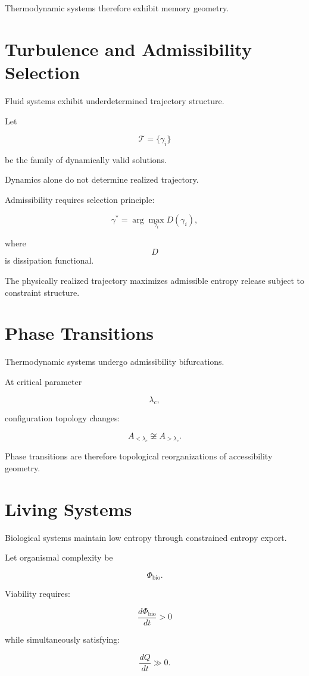 \documentclass[12pt,openany]{book}
\theoremstyle{plain}
\theoremstyle{definition}
\theoremstyle{remark}
\begin{document}
Thermodynamic systems therefore exhibit memory geometry.

\section{Turbulence and Admissibility Selection}

Fluid systems exhibit underdetermined trajectory structure.

Let

\[
\mathcal{T}
=
\{\gamma_i\}
\]

be the family of dynamically valid solutions.

Dynamics alone do not determine realized trajectory.

Admissibility requires selection principle:

\[
\gamma^\ast
=
\arg\max_{\gamma_i}
D(\gamma_i),
\]

where
\[
D
\]
is dissipation functional.

The physically realized trajectory maximizes admissible entropy
release subject to constraint structure.

\section{Phase Transitions}

Thermodynamic systems undergo admissibility bifurcations.

At critical parameter

\[
\lambda_c,
\]

configuration topology changes:

\[
A_{<\lambda_c}
\not\cong
A_{>\lambda_c}.
\]

Phase transitions are therefore topological reorganizations of
accessibility geometry.

\section{Living Systems}

Biological systems maintain low entropy through constrained
entropy export.

Let organismal complexity be

\[
\Phi_{\mathrm{bio}}.
\]

Viability requires:

\[
\frac{d\Phi_{\mathrm{bio}}}{dt}
>
0
\]

while simultaneously satisfying:

\[
\frac{dQ}{dt}
\gg
0.
\]
\end{document}
